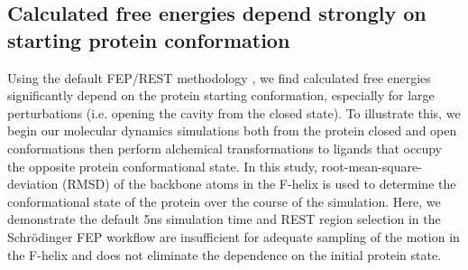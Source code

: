 \documentclass[journal=jctcce,manuscript=article]{achemso}
\begin{document}
\subsection*{Calculated free energies depend strongly on starting protein conformation}
Using the default FEP/REST methodology \cite{FEP/REST}, we find calculated free energies significantly depend on the protein starting conformation, especially for large perturbations (i.e. opening the cavity from the closed state).
To illustrate this, we begin our molecular dynamics simulations both from the protein closed and open conformations then perform alchemical transformations to ligands that occupy the opposite protein conformational state.
In this study, root-mean-square-deviation (RMSD) of the backbone atoms in the F-helix is used to determine the conformational state of the protein over the course of the simulation.
Here, we demonstrate the default 5ns simulation time and REST region selection in the Schr\"{o}dinger FEP workflow are insufficient for adequate sampling of the motion in the F-helix and does not eliminate the dependence on the initial protein state.
\end{document}
